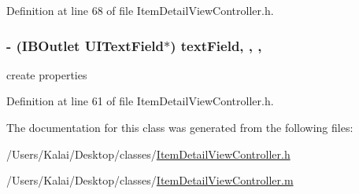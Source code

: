 Definition at line 68 of file Item\-Detail\-View\-Controller.\-h.

\hypertarget{interface_item_detail_view_controller_a178790ef36e700ef0735d92a3fdd5777}{
\subsubsection[{text\-Field}]{\setlength{\rightskip}{0pt plus 5cm}-\/ (I\-B\-Outlet U\-I\-Text\-Field$\ast$) text\-Field\hspace{0.3cm}{\ttfamily [read]}, {\ttfamily [write]}, {\ttfamily [nonatomic]}, {\ttfamily [strong]}}}\label{interface_item_detail_view_controller_a178790ef36e700ef0735d92a3fdd5777}


create properties 



Definition at line 61 of file Item\-Detail\-View\-Controller.\-h.



The documentation for this class was generated from the following files\-:\begin{DoxyCompactItemize}
\item 
/\-Users/\-Kalai/\-Desktop/classes/\hyperlink{_item_detail_view_controller_8h}{Item\-Detail\-View\-Controller.\-h}\item 
/\-Users/\-Kalai/\-Desktop/classes/\hyperlink{_item_detail_view_controller_8m}{Item\-Detail\-View\-Controller.\-m}\end{DoxyCompactItemize}
